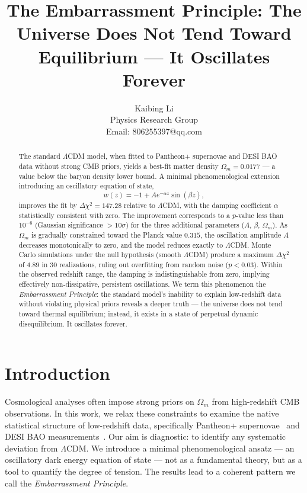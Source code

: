 \documentclass[10pt,a4paper,twocolumn]{article}
\begin{document}
\title{The Embarrassment Principle: The Universe Does Not Tend Toward Equilibrium — It Oscillates Forever}
\author{Kaibing Li\\
Physics Research Group\\
Email: 806255397@qq.com}
\date{}
\maketitle

\begin{abstract}
The standard $\Lambda$CDM model, when fitted to Pantheon+ supernovae and DESI BAO data without strong CMB priors, yields a best-fit matter density $\Omega_m = 0.0177$ — a value below the baryon density lower bound. A minimal phenomenological extension introducing an oscillatory equation of state,
\[
w(z) = -1 + A e^{-\alpha z}\sin(\beta z),
\]
improves the fit by $\Delta\chi^2 = 147.28$ relative to $\Lambda$CDM, with the damping coefficient $\alpha$ statistically consistent with zero. The improvement corresponds to a $p$-value less than $10^{-6}$ (Gaussian significance $>10\sigma$) for the three additional parameters ($A$, $\beta$, $\Omega_m$). As $\Omega_m$ is gradually constrained toward the Planck value $0.315$, the oscillation amplitude $A$ decreases monotonically to zero, and the model reduces exactly to $\Lambda$CDM. Monte Carlo simulations under the null hypothesis (smooth $\Lambda$CDM) produce a maximum $\Delta\chi^2$ of $4.89$ in 30 realizations, ruling out overfitting from random noise ($p<0.03$). Within the observed redshift range, the damping is indistinguishable from zero, implying effectively non‑dissipative, persistent oscillations. We term this phenomenon the \emph{Embarrassment Principle}: the standard model's inability to explain low-redshift data without violating physical priors reveals a deeper truth — the universe does not tend toward thermal equilibrium; instead, it exists in a state of perpetual dynamic disequilibrium. It oscillates forever.
\end{abstract}

\section{Introduction}
Cosmological analyses often impose strong priors on $\Omega_m$ from high-redshift CMB observations. In this work, we relax these constraints to examine the native statistical structure of low-redshift data, specifically Pantheon+ supernovae~\cite{Scolnic2022} and DESI BAO measurements~\cite{DESI2024}. Our aim is diagnostic: to identify any systematic deviation from $\Lambda$CDM. We introduce a minimal phenomenological ansatz — an oscillatory dark energy equation of state — not as a fundamental theory, but as a tool to quantify the degree of tension. The results lead to a coherent pattern we call the \emph{Embarrassment Principle}.
\end{document}
